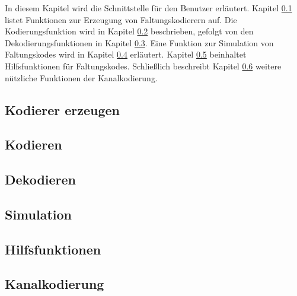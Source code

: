 
In diesem Kapitel wird die Schnittstelle für den Benutzer erläutert. Kapitel \ref{kapitel:interface_kodierer_erzeugen} listet Funktionen zur Erzeugung von Faltungskodierern auf. Die Kodierungsfunktion wird in Kapitel \ref{kapitel:interface_kodieren} beschrieben, gefolgt von den Dekodierungsfunktionen in Kapitel \ref{kapitel:interface_dekodieren}. Eine Funktion zur Simulation von Faltungskodes wird in Kapitel \ref{kapitel:interface_simulation} erläutert. Kapitel \ref{kapitel:interface_hilfsfunktionen} beinhaltet Hilfsfunktionen für Faltungskodes. Schließlich beschreibt Kapitel \ref{kapitel:interface_kanalkodierung} weitere nützliche Funktionen der Kanalkodierung.

\subsection{Kodierer erzeugen}
\label{kapitel:interface_kodierer_erzeugen}




\subsection{Kodieren}
\label{kapitel:interface_kodieren}


\subsection{Dekodieren}
\label{kapitel:interface_dekodieren}




\subsection{Simulation}
\label{kapitel:interface_simulation}


\subsection{Hilfsfunktionen}
\label{kapitel:interface_hilfsfunktionen}




\subsection{Kanalkodierung}
\label{kapitel:interface_kanalkodierung}




